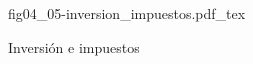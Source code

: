 \begin{figure}[h]
\centering
\def\svgwidth{0.5\textwidth}
{fig04_05-inversion_impuestos.pdf_tex}
\caption{Inversión e impuestos}
\label{fig04_05-inversion_impuestos}
\end{figure}